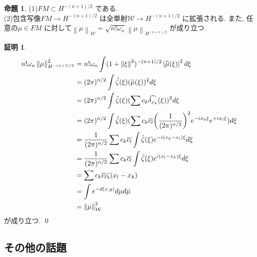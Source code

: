 \documentclass[10pt, fleqn, label-section=none]{bxjsarticle}
\theoremstyle{definition}
\newtheorem{prop}[dfn]{命題}
\newtheorem*{pf*}{証明}
\newcommand{\paren}[1]{\mleft( #1\mright )}
\newcommand{\abs}[1]{\left|#1\right|}
\newcommand{\norm}[1]{\left\|#1\right\|}
\renewcommand{\;}{\, ; \,}
\begin{document}
\begin{prop}(1)$FM \subset  H^{-(n+1)/2} $ である. \\
(2)包含写像$FM \rightarrow H^{-(n+1)/2} $ は全単射$\mathcal W \rightarrow H^{-(n+1)/ 2}$ に拡張される. また, 任意の$\mu \in FM$ に対して$\norm{\mu}_{\mathcal W} = \sqrt{n ! \omega_n} \norm{\mu}_{H^{(n+1)/2}}$ が成り立つ. 

\end{prop}
\begin{pf*}



\begin{align*} 
n! \omega _n \norm{\mu}^2_{H^{-(n+1)/2}} 
&= n! \omega _n \int (1 + \norm \xi ^2) ^{-(n+1)/2} \abs{\widehat \mu (\xi)}^2 d \xi
\\&= (2 \pi )^{n/2} \int \hat \zeta (\xi) (\hat \mu (\xi))^2 d\xi 
\\&= (2 \pi )^{n/2} \int \hat \zeta (\xi) (\sum c_k \widehat{\delta_{x_k}} (\xi))^2 d\xi 
\\&= (2 \pi )^{n/2} \int \hat \zeta (\xi) (\sum c_k \overline{c_l}  \paren{\frac{1}{(2\pi)^{n/2}}}^2 e^{- i x_k \xi} e^{ + i x_l \xi }  ) d\xi 
\\&= \frac{1}{(2 \pi )^{n/2}} \sum c_k \overline{c_l}  \int \hat \zeta (\xi)  e^{- i (x_k - x_l) \xi}   d\xi 
\\&=\frac{1}{(2 \pi )^{n/2}} \sum c_k \overline{c_l}  \int \hat \zeta (\xi)  e^{i (x_l - x_k) \xi}   d\xi 
\\&=  \sum c_k \overline{c_l}  \zeta (x_l - x_k)  
\\&= \int e^{-d(x, y)} d\mu d\bar \mu
\\& = \norm{\mu}^2_{\mathcal W}  
\end{align*}
が成り立つ. 
\qed
\end{pf*}













\subsection{その他の話題}
\end{document}
